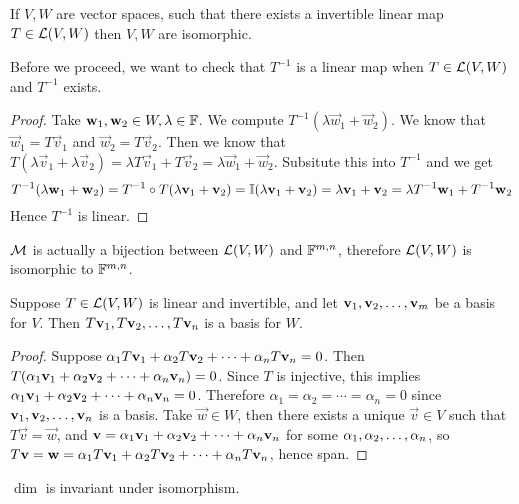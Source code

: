 \begin{definition}
    If $V,W$ are vector spaces, such that there exists a invertible linear map $T \in \mathcal L(V,W)$ then $V, W$ are isomorphic.
\end{definition}
\begin{remark}
    Before we proceed, we want to check that $T^{-1}$ is a linear map when $T \in \mathcal L(V,W)$ and $T^{-1}$ exists.
\end{remark}
\begin{proof}
    Take $\mathbf w_1,\mathbf w_2 \in W, \lambda \in \mathbb F$. We compute
    $T^{-1} (\lambda \vec w_1 + \vec w_2)$. We know that $\vec w_1 = T\vec v_1$ and $\vec w_2 = T\vec v_2$. Then we know that $T(\lambda \vec v_1  + \lambda \vec v_2) = \lambda T\vec v_1 + T\vec v_2 = \lambda\vec  w_1 +\vec  w_2$. Subsitute this into $T^{-1}$ and we get
    \[ T^{-1} (\lambda \mathbf w_1 + \mathbf w_2) = T^{-1} \circ T (\lambda \mathbf v_1 + \mathbf v_2) = \mathbb I (\lambda \mathbf v_1 + \mathbf v_2) = \lambda \mathbf v_1 + \mathbf v_2 = \lambda T^{-1} \mathbf w_1 + T^{-1} \mathbf w_2\] Hence $T^{-1}$ is linear.
\end{proof}
\begin{corollary}
    $\mathcal M$ is actually a bijection between $\mathcal L(V,W)$ and $\mathbb F^{m,n}$, therefore $\mathcal L(V,W)$ is isomorphic to $\mathbb F^{m,n}$.
\end{corollary}
\begin{theorem}
    Suppose $T \in \mathcal L(V,W)$ is linear and invertible, and let ${\mathbf v}_1,{\mathbf v}_2, \ldots, {\mathbf v}_{m}$ be a basis for $V$. Then ${T\mathbf v}_1,{T\mathbf v}_2, \ldots, {T\mathbf v}_{n}$ is a basis for $W$.
\end{theorem}
\begin{proof}
    Suppose ${\alpha}_1{T\mathbf v}_1 + {\alpha}_2{T\mathbf v}_2 + \cdots + {\alpha}_{n}{T\mathbf v}_{n} = 0$. Then $T({\alpha}_1{\mathbf v}_1 + {\alpha}_2{\mathbf v}_2 + \cdots + {\alpha}_{n}{\mathbf v}_{n}) = 0$. Since $T$ is injective, this implies ${\alpha}_1{\mathbf v}_1 + {\alpha}_2{\mathbf v}_2 + \cdots + {\alpha}_{n}{\mathbf v}_{n} = 0$. Therefore $\alpha_1 = \alpha_2 = \cdots = \alpha_n = 0$ since ${\mathbf v}_1,{\mathbf v}_2, \ldots, {\mathbf v}_{n}$ is a basis. Take $\vec w \in W$, then there exists a unique $\vec v \in V$ such that $T\vec v = \vec w$, and $\mathbf v = {\alpha}_1{\mathbf v}_1 + {\alpha}_2{\mathbf v}_2 + \cdots + {\alpha}_{n}{\mathbf v}_{n}$ for some ${\alpha}_1,{\alpha}_2, \ldots, {\alpha}_{n}$, so $T\mathbf v = \mathbf w = {\alpha}_1{T\mathbf v}_1 + {\alpha}_2{T\mathbf v}_2 + \cdots + {\alpha}_{n}{T\mathbf v}_{n}$, hence span. 
\end{proof}
\begin{corollary}
    $\dim$ is invariant under isomorphism.
\end{corollary}
